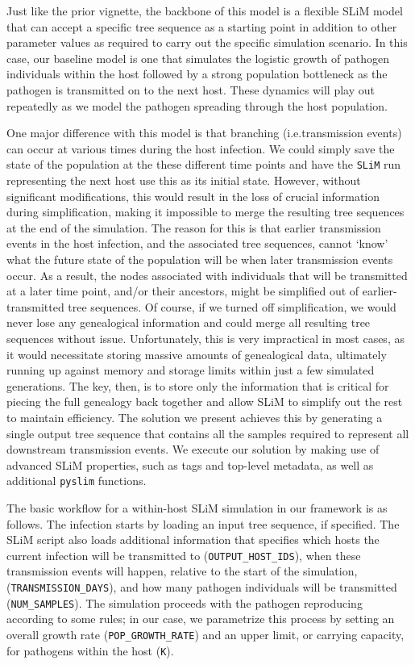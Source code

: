 \documentclass[12pt]{article}
\newcommand{\slim}[0]{\texttt{SLiM}\xspace}
\newcommand{\pyslim}[0]{\texttt{pyslim}\xspace}
\newcommand*{\ie}{i.e.\xcomma}
\begin{document}
Just like the prior vignette, the backbone of this model is a flexible SLiM model that can accept a specific tree sequence as a starting point in addition to other
parameter values as required to carry out the specific simulation scenario. In this case, our baseline model is one that simulates the logistic growth of pathogen individuals
within the host followed by a strong population bottleneck as the pathogen is transmitted on to the next host. These dynamics will play out repeatedly as we model the pathogen
spreading through the host population.

One major difference with this model is that branching (\ie transmission events) can occur at various times during the host infection.
We could simply save the state of the population at the these different time points and have the \slim run representing the next host use this
as its initial state. However, without significant modifications, this would result in the loss of crucial information during simplification, making it impossible
to merge the resulting tree sequences at the end of the simulation. The reason for this is that earlier transmission events in the host infection, and
the associated tree sequences, cannot `know' what the future state of the population will be when later transmission events occur. As a result, the nodes associated with
individuals that will be transmitted at a later time point, and/or their ancestors, might be simplified out of earlier-transmitted tree sequences. Of course, if we turned off
simplification, we would never lose any genealogical information and could merge all resulting tree sequences without issue. Unfortunately, this is very impractical in most cases,
as it would necessitate storing massive amounts of genealogical data, ultimately running up against memory and storage limits within just a few simulated generations.
The key, then, is to store only the information that is critical for piecing the full genealogy back together and allow SLiM to simplify out the rest to maintain efficiency. The
solution we present achieves this by generating a single output tree sequence that contains all the samples required to represent all downstream transmission events.
We execute our solution by making use of advanced SLiM properties, such as tags and top-level metadata, as well as additional \pyslim functions.

The basic workflow for a within-host SLiM simulation in our framework is as follows. The infection starts by loading an input tree sequence, if specified. The SLiM script also
loads additional information that specifies which hosts the current infection will be transmitted to (\verb|OUTPUT_HOST_IDS|), when these transmission events will happen, relative
to the start of the simulation, (\verb|TRANSMISSION_DAYS|), and how many pathogen individuals will be transmitted (\verb|NUM_SAMPLES|). The simulation proceeds with the pathogen reproducing according
to some rules; in our case, we parametrize this process by setting an overall growth rate (\verb|POP_GROWTH_RATE|) and an upper limit, or carrying capacity, for pathogens
within the host (\verb|K|).
\end{document}
